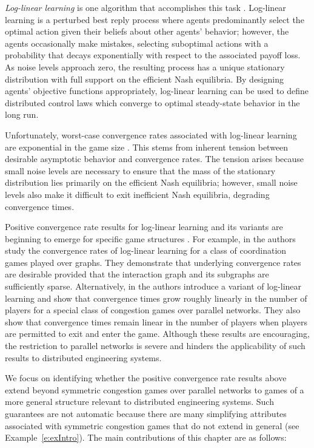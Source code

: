 {\it Log-linear learning} is one algorithm that accomplishes this task \cite{Blume1993}. Log-linear learning is a  {perturbed} best reply process where agents predominantly select the optimal action given their beliefs about other agents' behavior; however, the agents occasionally make mistakes, selecting suboptimal actions with a probability that decays exponentially with respect to the associated payoff loss.  
As noise levels approach zero, the resulting process has a unique stationary distribution with full support on the efficient Nash equilibria.  By designing agents' objective functions appropriately, log-linear learning can be used to define distributed control laws which converge to optimal steady-state behavior in the long run.%


Unfortunately, worst-case convergence rates associated with log-linear learning are exponential in the game size \cite{Shah2010}.  This stems from inherent tension between desirable asymptotic behavior and convergence rates.  The tension arises because small noise levels are necessary to ensure that the mass of the stationary distribution lies primarily on the efficient Nash equilibria; however, small noise levels also make it difficult to exit inefficient Nash equilibria,  degrading convergence times.  

Positive convergence rate results for log-linear learning and its variants are beginning to emerge for specific game structures \cite{Montanari2010,Kreindler2011,Shah2010,Arieli2011}.  For example, in \cite{Montanari2010} the authors study the convergence rates of log-linear learning for a class of coordination games played over graphs. They demonstrate that underlying convergence rates are desirable provided that the interaction graph and its subgraphs are sufficiently sparse.  Alternatively, in \cite{Shah2010} the authors introduce a variant of log-linear learning and show that  convergence times grow roughly linearly in the number of players for a special class of congestion games over parallel networks.  They also show that convergence times remain linear in the number of players when players are permitted to exit and enter the game.  Although these results are encouraging, the restriction to parallel networks is severe and hinders the applicability of such results to distributed engineering systems.  

We focus on identifying whether the positive convergence rate results above extend beyond symmetric congestion games over parallel networks to games of a more general structure relevant to distributed engineering systems.  Such guarantees are not automatic because there are many simplifying attributes associated with symmetric congestion games that do not extend in general (see Example~\ref{e:exIntro}).  The main contributions of this chapter are as follows:

